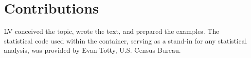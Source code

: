 \documentclass[inline]{hdsr}
\begin{document}
\section*{Contributions}

LV conceived the topic, wrote the text, and prepared the examples. The statistical code used within the container, serving as a stand-in for any statistical analysis, was provided by Evan Totty, U.S. Census Bureau.  


\appendix




\printbibliography


\end{document}
